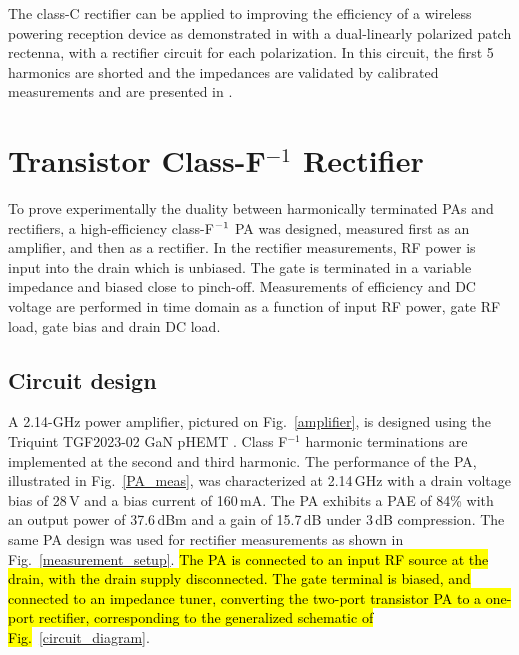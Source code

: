 The class-C rectifier can be applied to improving the efficiency of a wireless powering reception device as demonstrated in \cite{robergIMS2012} with a dual-linearly polarized patch rectenna, with a rectifier circuit for each polarization. In this circuit, the first 5 harmonics are shorted and the impedances are validated by calibrated measurements and are presented in \cite{robergIMS2012}.















\section{Transistor Class-F$^{-1}$ Rectifier}

To prove experimentally the duality between harmonically terminated PAs and rectifiers, a high-efficiency class-F$^{\rm -1}$ PA was designed, measured first as an amplifier, and then as a rectifier. In the rectifier measurements, RF power is input into the drain which is unbiased. The gate is terminated in a variable impedance and biased close to pinch-off. Measurements of efficiency and DC voltage are performed in time domain as a function of input RF power, gate RF load, gate bias and drain DC load.

\subsection {Circuit design}

A 2.14-GHz power amplifier, pictured on Fig.~\ref{amplifier}, is designed using the Triquint TGF2023-02 GaN pHEMT \cite{gan_pa_letter}. Class F$^{-1}$ harmonic terminations are implemented at the second and third harmonic. The performance of the PA, illustrated in  Fig.~\ref{PA_meas}, was characterized at 2.14\,GHz with a drain voltage bias of 28\,V and a bias current of 160\,mA. The PA exhibits a PAE of 84\% with an output power of 37.6\,dBm and a gain of 15.7\,dB under 3\,dB compression. The same PA design was used for rectifier measurements as shown in Fig.~\ref{measurement_setup}. \hl{The PA is connected to an input RF source at the drain, with the drain supply disconnected. The gate terminal is biased, and connected to an impedance tuner, converting the two-port transistor PA to a one-port rectifier, corresponding to the generalized schematic of Fig.}~\ref{circuit_diagram}.

